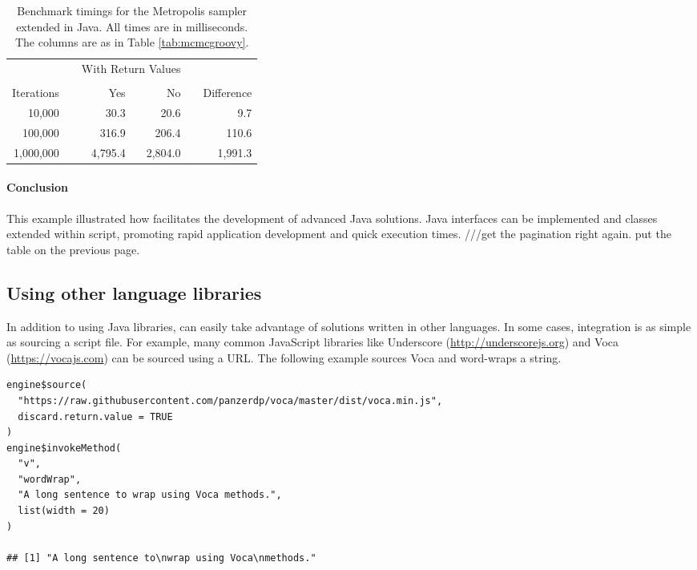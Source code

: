 \vspace{0.33cm}

\begin{table}[h!]
\centering
\caption{Benchmark timings for the Metropolis sampler extended in Java. All times are in milliseconds. The columns are as in Table \ref{tab:mcmcgroovy}.}
\begin{tabular}{rrrrrr}
\toprule
& & \multicolumn{2}{c}{With Return Values} & & \\
\cline{3-4} \\[-8pt]
Iterations & & \multicolumn{1}{r}{Yes} & \multicolumn{1}{r}{No} & & Difference \\ \midrule
10,000 & & 30.3 & 20.6 & & 9.7 \\
100,000 & & 316.9 & 206.4 & & 110.6 \\
1,000,000 & & 4,795.4 & 2,804.0 & & 1,991.3 \\ \bottomrule
\end{tabular}
\label{tab:mcmcjava}
\end{table}

\paragraph{Conclusion} This example illustrated how  facilitates the development of advanced Java solutions. Java interfaces can be implemented and classes extended within script, promoting rapid application development and quick execution times. ///get the pagination right again. put the table on the previous page.

\subsection{Using other language libraries} %

In addition to using Java libraries,  can easily take advantage of solutions written in other languages. In some cases, integration is as simple as sourcing a script file. For example, many common JavaScript libraries like Underscore (\url{http://underscorejs.org}) and Voca (\url{https://vocajs.com}) can be sourced using a URL. The following example sources Voca and word-wraps a string.

\begin{verbatim}
engine$source(
  "https://raw.githubusercontent.com/panzerdp/voca/master/dist/voca.min.js",
  discard.return.value = TRUE
)
engine$invokeMethod(
  "v",
  "wordWrap",
  "A long sentence to wrap using Voca methods.",
  list(width = 20)
)

## [1] "A long sentence to\nwrap using Voca\nmethods."
\end{verbatim}

